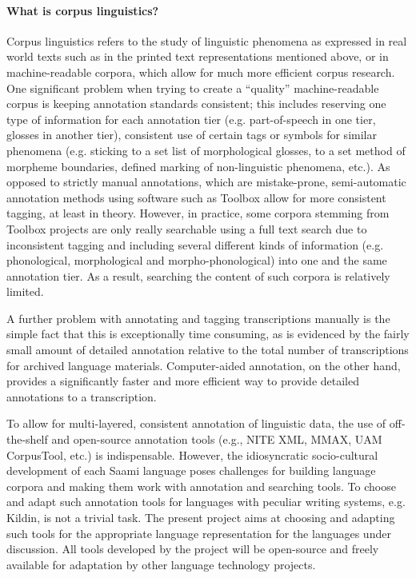 \documentclass[a4paper,12pt]{article}
\begin{document}
\paragraph{What is corpus linguistics?} Corpus linguistics refers to the study of linguistic phenomena as expressed in real world texts such as in the printed text representations mentioned above, or in machine-readable corpora, which allow for much more efficient corpus research. One significant problem when trying to create a “quality” machine-readable corpus is keeping annotation standards consistent; this includes reserving one type of information for each annotation tier (e.g. part-of-speech in one tier, glosses in another tier), consistent use of certain tags or symbols for similar phenomena (e.g. sticking to a set list of morphological glosses, to a set method of morpheme boundaries, defined marking of non-linguistic phenomena, etc.). As opposed to strictly manual annotations, which are mistake-prone, semi-automatic annotation methods using software such as Toolbox allow for more consistent tagging, at least in theory. However, in practice, some corpora stemming from Toolbox projects are only really searchable using a full text search due to inconsistent tagging and including several different kinds of information (e.g. phonological, morphological and morpho-phonological) into one and the same annotation tier. As a result, searching the content of such corpora is relatively limited.

A further problem with annotating and tagging transcriptions manually is the simple fact that this is exceptionally time consuming, as is evidenced by the fairly small amount of detailed annotation relative to the total number of transcriptions for archived language materials. Computer-aided annotation, on the other hand, provides a significantly faster and more efficient way to provide detailed annotations to a transcription.

To allow for multi-layered, consistent annotation of linguistic data, the use of off-the-shelf and open-source annotation tools (e.g., NITE XML, MMAX, UAM CorpusTool, etc.) is indispensable. However, the idiosyncratic socio-cultural development of each Saami language poses challenges for building language corpora and making them work with annotation and searching tools. To choose and adapt such annotation tools for languages with peculiar writing systems, e.g. Kildin, is not a trivial task. The present project aims at choosing and adapting such tools for the appropriate language representation for the languages under discussion. All tools developed by the project will be open-source and freely available for adaptation by other language technology projects. 
\end{document}
